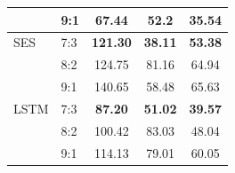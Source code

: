 \documentclass[conference]{IEEEtran}
\begin{document}
\begin{table}[H]
\begin{tabular}{|l|l|c|c|c|}
                               & 9:1                         & 67.44                     & 52.2                           & 35.54                    \\ \hline
        SES                    & 7:3                         & \textbf{121.30}           & \textbf{38.11}                 & \textbf{53.38}           \\ \cline{2-5}
                               & 8:2                         & 124.75                    & 81.16                          & 64.94                    \\ \cline{2-5}
                               & 9:1                         & 140.65                    & 58.48                          & 65.63                    \\ \hline
        LSTM                   & 7:3                         & \textbf{87.20}            & \textbf{51.02}                 & \textbf{39.57}           \\ \cline{2-5}
                               & 8:2                         & 100.42                    & 83.03                          & 48.04                    \\ \cline{2-5}
                               & 9:1                         & 114.13                    & 79.01                          & 60.05                    \\ \hline
    \end{tabular}
    \label{mbbresult}
\end{table}
\end{document}
